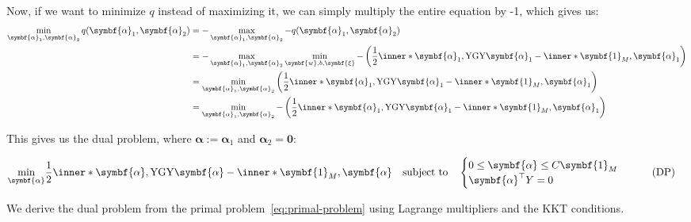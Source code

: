 Now, if we want to minimize $q$ instead of maximizing it, we can simply multiply the entire equation by -1, which gives us:
\begin{align*}
	\min_{\symbf{\alpha}_1, \symbf{\alpha}_2} q(\symbf{\alpha}_1,\symbf{\alpha}_2) & = -\max_{\symbf{\alpha}_1, \symbf{\alpha}_2} -q(\symbf{\alpha}_1,\symbf{\alpha}_2)                                                                                                                                             \\
	                                                                               & = -\max_{\symbf{\alpha}_1, \symbf{\alpha}_2} \min_{\symbf{w}, b, \symbf{\xi}} -\left(\frac{1}{2}\inner*{\symbf{\alpha}_1, \mathrm{Y} \mathrm{G} \mathrm{Y} \symbf{\alpha}_1} -  \inner*{\symbf{1}_M, \symbf{\alpha}_1} \right) \\
	                                                                               & = \min_{\symbf{\alpha}_1, \symbf{\alpha}_2} \left(\frac{1}{2}\inner*{\symbf{\alpha}_1, \mathrm{Y} \mathrm{G} \mathrm{Y} \symbf{\alpha}_1} -  \inner*{\symbf{1}_M, \symbf{\alpha}_1} \right)                                    \\
	                                                                               & = \min_{\symbf{\alpha}_1, \symbf{\alpha}_2} -\left(\frac{1}{2}\inner*{\symbf{\alpha}_1, \mathrm{Y} \mathrm{G} \mathrm{Y} \symbf{\alpha}_1} -  \inner*{\symbf{1}_M, \symbf{\alpha}_1} \right)                                   \\
\end{align*}

This gives us the dual problem, where \(\symbf{\alpha} := \symbf{\alpha}_1\) and \(\symbf{\alpha}_2 = \symbf{0}\):

\begin{align}\label{eq:dual-problem}
	\min_{\symbf{\alpha}} & \frac{1}{2} \inner*{\symbf{\alpha}, \mathrm{Y} \mathrm{G} \mathrm{Y} \symbf{\alpha}} -  \inner*{\symbf{1}_M, \symbf{\alpha}}
	\quad
	\text{subject to}
	\quad
	\begin{cases}
		0 \leq \symbf{\alpha} \leq C\symbf{1}_M \\
		\symbf{\alpha}^\top Y = 0
	\end{cases}\tag{DP}
\end{align}\qedhere



We derive the dual problem from the primal problem~\eqref{eq:primal-problem} using Lagrange multipliers and the KKT conditions.

